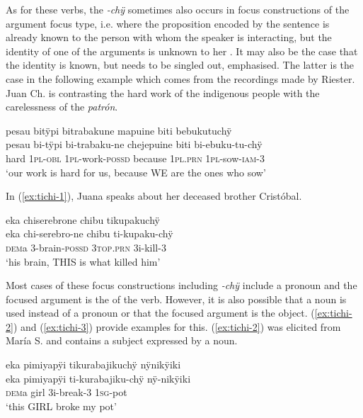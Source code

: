 
As for these verbs, the \textit{-chÿ} sometimes also occurs in focus constructions of the argument focus type, i.e. where the proposition encoded by the sentence is already known to the person with whom the speaker is interacting, but the identity of one of the arguments is unknown to her \citep[cf.][228]{Lambrecht1994}. It may also be the case that the identity is known, but needs to be singled out, emphasised. The latter is the case in the following example which comes from the recordings made by Riester. Juan Ch. is contrasting the hard work of the indigenous people with the carelessness of the \textit{patrón}.

\ea\label{ex:bichÿ}
\begingl
\glpreamble pesau bitÿpi bitrabakune mapuine biti bebukutuchÿ\\
\gla pesau bi-tÿpi bi-trabaku-ne chejepuine biti bi-ebuku-tu-chÿ\\
\glb hard 1\textsc{pl}-\textsc{obl} 1\textsc{pl}-work-\textsc{possd} because 1\textsc{pl.prn} 1\textsc{pl}-sow-\textsc{iam}-3\\
\glft ‘our work is hard for us, because WE are the ones who sow’
\endgl
\trailingcitation{[nxx-p630101g-1.088]}
\xe

In (\ref{ex:tichi-1}), Juana speaks about her deceased brother Cristóbal.

\ea\label{ex:tichi-1}
\begingl
\glpreamble eka chiserebrone chibu tikupakuchÿ\\
\gla eka chi-serebro-ne chibu ti-kupaku-chÿ\\
\glb \textsc{dem}a 3-brain-\textsc{possd} 3\textsc{top.prn} 3i-kill-3\\
\glft ‘his brain, THIS is what killed him’
\endgl
\trailingcitation{[jxx-p120430l-2.383]}
\xe

Most cases of these focus constructions including \textit{-chÿ} include a pronoun and the focused argument is the  of the verb. However, it is also possible that a noun is used instead of a pronoun or that the focused argument is the object. (\ref{ex:tichi-2}) and (\ref{ex:tichi-3}) provide examples for this. (\ref{ex:tichi-2}) was elicited from María S. and contains a subject expressed by a noun.

\ea\label{ex:tichi-2}
\begingl
\glpreamble eka pimiyapÿi tikurabajikuchÿ nÿnikÿiki\\
\gla eka pimiyapÿi ti-kurabajiku-chÿ nÿ-nikÿiki\\
\glb \textsc{dem}a girl 3i-break-3 1\textsc{sg}-pot\\
\glft ‘this GIRL broke my pot’
\endgl
\trailingcitation{[rxx-e181024l]}
\xe

